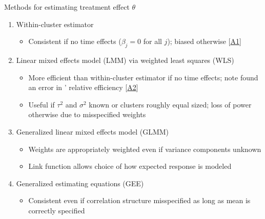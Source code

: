 \documentclass[9pt]{beamer}
\begin{document}
\begin{frame}{Methods for estimating treatment effect $\theta$ \citep{Hussey:2007}} \label{slide:methods}

\begin{enumerate}
\setlength\itemsep{2em}

\item
Within-cluster estimator
\begin{itemize}
\setlength\itemsep{0.5em}
\item
Consistent if no time effects ($\beta_j=0$ for all $j$); biased otherwise [\hyperlink{apx:withincluster}{\color{red}A1}]
\end{itemize}

\item
Linear mixed effects model (LMM) via weighted least squares (WLS)
\begin{itemize}
\setlength\itemsep{0.5em}
\item
More efficient than within-cluster estimator if no time effects; note \citet{Liao:2015} found an error in \citeauthor{Hussey:2007}' relative efficiency [\hyperlink{apx:efficiency}{\color{red}A2}]
\item
Useful if $\tau^2$ and $\sigma^2$ known or clusters roughly equal sized; loss of power otherwise due to misspecified weights
\end{itemize}

\item
Generalized linear mixed effects model (GLMM)
\begin{itemize}
\setlength\itemsep{0.5em}
\item
Weights are appropriately weighted even if variance components unknown
\item
Link function allows choice of how expected response is modeled
\end{itemize}

\item
Generalized estimating equations (GEE)
\begin{itemize}
\setlength\itemsep{0.5em}
\item
Consistent even if correlation structure misspecified as long as mean is correctly specified
\end{itemize}

\end{enumerate}
\end{frame}
\end{document}
